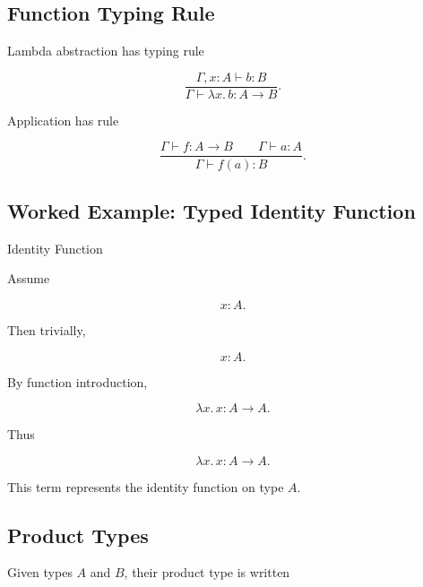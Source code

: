 \subsection{Function Typing Rule}
\label{subsec:function-typing-rule}

Lambda abstraction has typing rule

\[
\boxed{
\frac{
\Gamma,x:A
\vdash
b:B
}{
\Gamma
\vdash
\lambda x.\,b
:
A\to B
}.
}
\]

Application has rule

\[
\boxed{
\frac{
\Gamma\vdash f:A\to B
\qquad
\Gamma\vdash a:A
}{
\Gamma\vdash f(a):B
}.
}
\]

\subsection{Worked Example: Typed Identity Function}
\label{subsec:worked-typed-identity}

\begin{workedexamplebox}{Identity Function}

Assume

\[
x:A.
\]

Then trivially,

\[
x:A.
\]

By function introduction,

\[
\lambda x.\,x
:
A\to A.
\]

Thus

\begin{answerbox}
\[
\boxed{
\lambda x.\,x
:
A\to A.
}
\]
\end{answerbox}

This term represents the identity function on type \(A\).

\end{workedexamplebox}

\subsection{Product Types}
\label{subsec:product-types}

Given types \(A\) and \(B\), their product type is written


